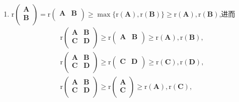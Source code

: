 \documentclass[../../main.tex]{subfiles}%
\begin{document}
\begin{proposition}[矩阵秩的基本公式]
\begin{enumerate}[(1)]
\item \label{矩阵秩的基本公式7} $\mathrm{r}\left( \begin{array}{c}
\boldsymbol{A}\\
\boldsymbol{B}\\
\end{array} \right) =\mathrm{r}\left( \begin{matrix}
\boldsymbol{A}&		\boldsymbol{B}\\
\end{matrix} \right)\geqslant\max\{\mathrm{r}\left( \boldsymbol{A} \right) ,\mathrm{r}\left( \boldsymbol{B} \right)\} \geqslant \mathrm{r}\left( \boldsymbol{A} \right) ,\mathrm{r}\left( \boldsymbol{B} \right)$,进而
\begin{gather*}
\mathrm{r}\left( \begin{matrix}
\boldsymbol{A}&		\boldsymbol{B}\\
\boldsymbol{C}&		\boldsymbol{D}\\
\end{matrix} \right) \geqslant \mathrm{r}\left( \begin{matrix}
\boldsymbol{A}&		\boldsymbol{B}\\
\end{matrix} \right) \geqslant \mathrm{r}\left( \boldsymbol{A} \right) ,\mathrm{r}\left( \boldsymbol{B} \right) ,
\\
\mathrm{r}\left( \begin{matrix}
\boldsymbol{A}&		\boldsymbol{B}\\
\boldsymbol{C}&		\boldsymbol{D}\\
\end{matrix} \right) \geqslant \mathrm{r}\left( \begin{matrix}
\boldsymbol{C}&		\boldsymbol{D}\\
\end{matrix} \right) \geqslant \mathrm{r}\left( \boldsymbol{C} \right) ,\mathrm{r}\left( \boldsymbol{D} \right) ,
\\
\mathrm{r}\left( \begin{matrix}
\boldsymbol{A}&		\boldsymbol{B}\\
\boldsymbol{C}&		\boldsymbol{D}\\
\end{matrix} \right) \geqslant \mathrm{r}\left( \begin{array}{c}
\boldsymbol{A}\\
\boldsymbol{C}\\
\end{array} \right) \geqslant \mathrm{r}\left( \boldsymbol{A} \right) ,\mathrm{r}\left( \boldsymbol{C} \right) ,

\end{gather*}
\end{enumerate}
\end{proposition}
\end{document}
